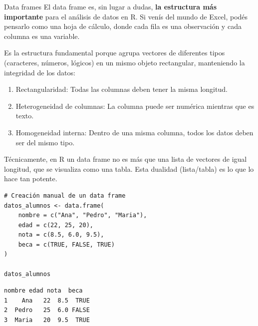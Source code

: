 \documentclass[8pt]{beamer}
\begin{document}
\begin{frame}[fragile]{Data frames}
	El data frame es, sin lugar a dudas, \textbf{la estructura más importante} para el análisis de datos en R. Si venís del mundo de Excel, podés pensarlo como una hoja de cálculo, donde cada fila es una observación y cada columna es una variable.
	
	Es la estructura fundamental porque agrupa vectores de diferentes tipos (caracteres, números, lógicos) en un mismo objeto rectangular, manteniendo la integridad de los datos:
	\begin{enumerate}
		\item Rectangularidad: Todas las columnas deben tener la misma longitud.
		\item Heterogeneidad de columnas: La columna   puede ser numérica mientras que   es texto.
		\item Homogeneidad interna: Dentro de una misma columna, todos los datos deben ser del mismo tipo.		
	\end{enumerate}
		
	Técnicamente, en R un data frame no es más que una lista de vectores de igual longitud, que se visualiza como una tabla. Esta dualidad (lista/tabla) es lo que lo hace tan potente.
\end{frame}


\begin{frame}[fragile]
\begin{lstlisting}[style=RScript]
# Creación manual de un data frame
datos_alumnos <- data.frame(
	nombre = c("Ana", "Pedro", "Maria"),
	edad = c(22, 25, 20),
	nota = c(8.5, 6.0, 9.5),
	beca = c(TRUE, FALSE, TRUE)
)

datos_alumnos
\end{lstlisting}
\begin{lstlisting}[style=RConsole]
  nombre edad nota  beca
1    Ana   22  8.5  TRUE
2  Pedro   25  6.0 FALSE
3  Maria   20  9.5  TRUE
\end{lstlisting}
\end{frame}
\end{document}

